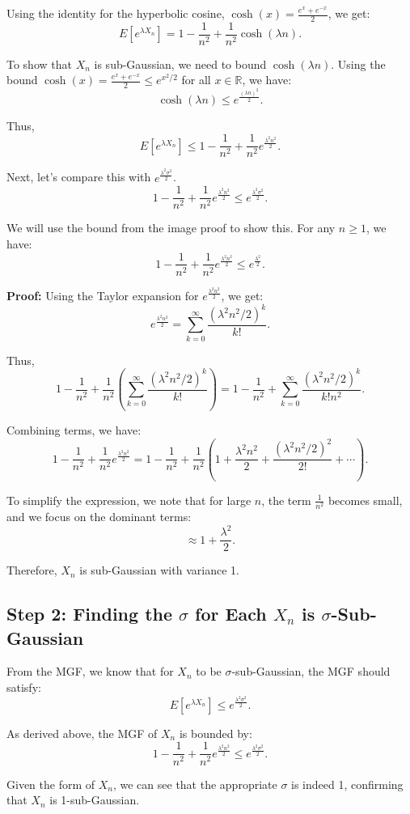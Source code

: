 \documentclass[a4 paper]{article}
\theoremstyle{boldStyle}
\theoremstyle{boldBlueStyle}
\theoremstyle{boldPurpleStyle}
\theoremstyle{boldRedStyle}
\begin{document}
\begin{enumerate}
Using the identity for the hyperbolic cosine, $\cosh(x) = \frac{e^x + e^{-x}}{2}$, we get:
\[
E[e^{\lambda X_n}] = 1 - \frac{1}{n^2} + \frac{1}{n^2} \cosh(\lambda n).
\]

To show that $X_n$ is sub-Gaussian, we need to bound $\cosh(\lambda n)$. Using the bound $\cosh(x) = \frac{e^x + e^{-x}}{2} \leq e^{x^2/2}$ for all $x \in \mathbb{R}$, we have:
\[
\cosh(\lambda n) \leq e^{\frac{(\lambda n)^2}{2}}.
\]

Thus,
\[
E[e^{\lambda X_n}] \leq 1 - \frac{1}{n^2} + \frac{1}{n^2} e^{\frac{\lambda^2 n^2}{2}}.
\]

Next, let's compare this with $e^{\frac{\lambda^2 \sigma^2}{2}}$. 
\[
1 - \frac{1}{n^2} + \frac{1}{n^2} e^{\frac{\lambda^2 n^2}{2}} \leq e^{\frac{\lambda^2 \sigma^2}{2}}.
\]

We will use the bound from the image proof to show this. For any $n \geq 1$, we have:
\[
1 - \frac{1}{n^2} + \frac{1}{n^2} e^{\frac{\lambda^2 n^2}{2}} \leq e^{\frac{\lambda^2}{2}}.
\]

\textbf{Proof:}
Using the Taylor expansion for $e^{\frac{\lambda^2 n^2}{2}}$, we get:
\[
e^{\frac{\lambda^2 n^2}{2}} = \sum_{k=0}^{\infty} \frac{(\lambda^2 n^2 / 2)^k}{k!}.
\]

Thus,
\[
1 - \frac{1}{n^2} + \frac{1}{n^2} \left( \sum_{k=0}^{\infty} \frac{(\lambda^2 n^2 / 2)^k}{k!} \right) = 1 - \frac{1}{n^2} + \sum_{k=0}^{\infty} \frac{(\lambda^2 n^2 / 2)^k}{k! n^2}.
\]

Combining terms, we have:
\[
1 - \frac{1}{n^2} + \frac{1}{n^2} e^{\frac{\lambda^2 n^2}{2}} = 1 - \frac{1}{n^2} + \frac{1}{n^2} \left(1 + \frac{\lambda^2 n^2}{2} + \frac{(\lambda^2 n^2 / 2)^2}{2!} + \cdots \right).
\]

To simplify the expression, we note that for large $n$, the term $\frac{1}{n^2}$ becomes small, and we focus on the dominant terms:
\[
\approx 1 + \frac{\lambda^2}{2}.
\]

Therefore, $X_n$ is sub-Gaussian with variance 1.

\subsection*{Step 2: Finding the $\sigma$ for Each $X_n$ is $\sigma$-Sub-Gaussian}

From the MGF, we know that for $X_n$ to be $\sigma$-sub-Gaussian, the MGF should satisfy:
\[
E[e^{\lambda X_n}] \leq e^{\frac{\lambda^2 \sigma^2}{2}}.
\]

As derived above, the MGF of $X_n$ is bounded by:
\[
1 - \frac{1}{n^2} + \frac{1}{n^2} e^{\frac{\lambda^2 n^2}{2}} \leq e^{\frac{\lambda^2 \sigma^2}{2}}.
\]

Given the form of $X_n$, we can see that the appropriate $\sigma$ is indeed 1, confirming that $X_n$ is 1-sub-Gaussian.





\end{enumerate}
\end{document}
